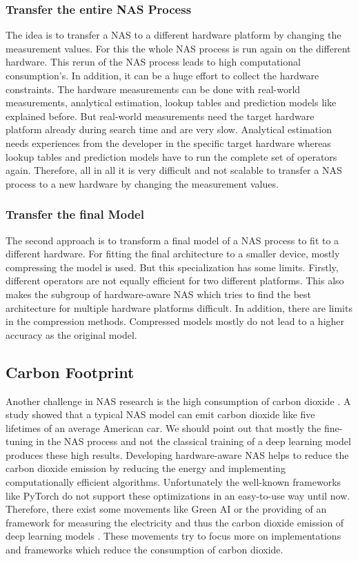 \documentclass[conference]{IEEEtran}
\begin{document}
\subsubsection{Transfer the entire NAS Process}

The idea is to transfer a NAS to a different hardware platform by changing the measurement values. For this the whole NAS process is run again on the different hardware. This rerun of the NAS process leads to high computational consumption's. In addition, it can be a huge effort to collect the hardware constraints. The hardware measurements can be done with real-world measurements, analytical estimation, lookup tables and prediction models like explained before. But real-world measurements need the target hardware platform already during search time and are very slow. Analytical estimation needs experiences from the developer in the specific target hardware whereas lookup tables and prediction models have to run the complete set of operators again. Therefore, all in all it is very difficult and not scalable to transfer a NAS process to a new hardware by changing the measurement values. 

\subsubsection{Transfer the final Model}

The second approach is to transform a final model of a NAS process to fit to a different hardware. For fitting the final architecture to a smaller device, mostly compressing the model is used. But this specialization has some limits. Firstly, different operators are not equally efficient for two different platforms. This also makes the subgroup of hardware-aware NAS which tries to find the best architecture for multiple hardware platforms difficult. In addition, there are limits in the compression methods. Compressed models mostly do not lead to a higher accuracy as the original model. 

\subsection{Carbon Footprint}
Another challenge in NAS research is the high consumption of carbon dioxide \cite{bib7}. A study showed that a typical NAS model can emit carbon dioxide like five lifetimes of an average American car. We should point out that mostly the fine-tuning in the NAS process and not the classical training of a deep learning model produces these high results. Developing hardware-aware NAS helps to reduce the carbon dioxide emission by reducing the energy and implementing computationally efficient algorithms. Unfortunately the well-known frameworks like PyTorch do not support these optimizations in an easy-to-use way until now. Therefore, there exist some movements like Green AI \cite{bib8} or the providing of an framework for measuring the electricity and thus the carbon dioxide emission of deep learning models \cite{bib9}. These movements try to focus more on implementations and frameworks which reduce the consumption of carbon dioxide.
\end{document}
